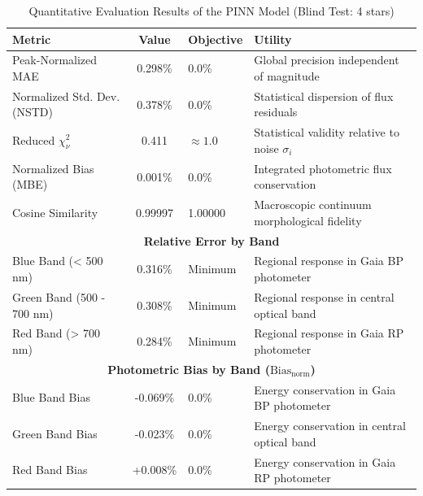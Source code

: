 
\begin{table}[htpb]
\centering
\caption{Quantitative Evaluation Results of the PINN Model (Blind Test: 4 stars)}
\label{tab:pinn_evaluation}
\begin{tabular}{lcll}
\hline
\textbf{Metric} & \textbf{Value} & \textbf{Objective} & \textbf{Utility} \\
\hline
Peak-Normalized MAE & 0.298\% & 0.0\% & Global precision independent of magnitude \\
Normalized Std. Dev. (NSTD) & 0.378\% & 0.0\% & Statistical dispersion of flux residuals \\
Reduced $\chi^2_\nu$ & 0.411 & $\approx 1.0$ & Statistical validity relative to noise $\sigma_i$ \\
Normalized Bias (MBE) & 0.001\% & 0.0\% & Integrated photometric flux conservation \\
Cosine Similarity & 0.99997 & 1.00000 & Macroscopic continuum morphological fidelity \\
\hline
\multicolumn{4}{c}{\textbf{Relative Error by Band}} \\
\hline
Blue Band (< 500 nm) & 0.316\% & Minimum & Regional response in Gaia BP photometer \\
Green Band (500 - 700 nm) & 0.308\% & Minimum & Regional response in central optical band \\
Red Band (> 700 nm) & 0.284\% & Minimum & Regional response in Gaia RP photometer \\
\hline
\multicolumn{4}{c}{\textbf{Photometric Bias by Band ($\text{Bias}_{\text{norm}}$)}} \\
\hline
Blue Band Bias & -0.069\% & 0.0\% & Energy conservation in Gaia BP photometer \\
Green Band Bias & -0.023\% & 0.0\% & Energy conservation in central optical band \\
Red Band Bias & +0.008\% & 0.0\% & Energy conservation in Gaia RP photometer \\
\hline
\end{tabular}
\end{table}
